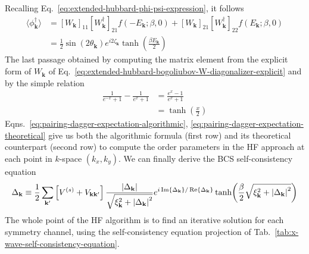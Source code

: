 Recalling Eq.~\eqref{eq:extended-hubbard-phi-psi-expression}, it follows
\begin{align}
	\langle \phi_\mathbf{k}^\dagger \rangle &= [W_\mathbf{k}]_{11} [W_\mathbf{k}^\dagger]_{21} f\left( -E_\mathbf{k}; \beta,0 \right) + [W_\mathbf{k}]_{21} [W_\mathbf{k}^\dagger]_{22} f\left( E_\mathbf{k}; \beta,0 \right) \label{eq:pairing-dagger-expectation-algorithmic} \\
	&= \frac{1}{2} \sin \left(
	2 \theta_\mathbf{k}
	\right) e^{i 2 \zeta_\mathbf{k}} \tanh(\frac{\beta E_\mathbf{k}}{2}) \label{eq:pairing-dagger-expectation-theoretical}
\end{align}
The last passage obtained by computing the matrix element from the explicit form of $W_\mathbf{k}$ of Eq.~\eqref{eq:extended-hubbard-bogoliubov-W-diagonalizer-explicit} and by the simple relation
\[
\begin{aligned}
	\frac{1}{e^{-x}+1} - \frac{1}{e^x+1} &= \frac{e^x -1}{e^x +1} \\
	&= \tanh(\frac{x}{2})
\end{aligned}
\]
Eqns.~\eqref{eq:pairing-dagger-expectation-algorithmic}, \eqref{eq:pairing-dagger-expectation-theoretical} give us both the algorithmic formula (first row) and its theoretical counterpart (second row) to compute the order parameters in the HF approach at each point in $k$-space $(k_x,k_y)$. We can finally derive the BCS self-consistency equation
\begin{equation}\label{eq:self-consistency-equation-theoretical}
	\Delta_\mathbf{k} \equiv \frac{1}{2} \sum_{\mathbf{k}'}
	\left[
	V^{(s)} +
	V_{\mathbf{k}\mathbf{k}'}
	\right] \frac{\abs{\Delta_\mathbf{k}}}{\sqrt{\xi_\mathbf{k}^2 + \abs{\Delta_\mathbf{k}}^2}} e^{i \Im{\Delta_\mathbf{k}}/\Re{\Delta_\mathbf{k}}} \tanh(\frac{\beta}{2} \sqrt{\xi_\mathbf{k}^2 + \abs{\Delta_\mathbf{k}}^2})
\end{equation}
The whole point of the HF algorithm is to find an iterative solution for each symmetry channel, using the self-consistency equation projection of Tab.~\ref{tab:x-wave-self-consistency-equation}.

